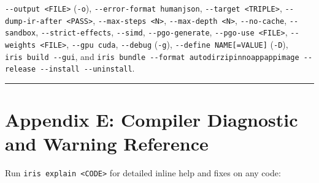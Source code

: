 \documentclass[
  english,
  oneside]{book}
\begin{document}
\texttt{-\/-output\ \textless{}FILE\textgreater{}} (\texttt{-o}),
\texttt{-\/-error-format\ human\textbar{}json},
\texttt{-\/-target\ \textless{}TRIPLE\textgreater{}},
\texttt{-\/-dump-ir-after\ \textless{}PASS\textgreater{}},
\texttt{-\/-max-steps\ \textless{}N\textgreater{}},
\texttt{-\/-max-depth\ \textless{}N\textgreater{}},
\texttt{-\/-no-cache}, \texttt{-\/-sandbox},
\texttt{-\/-strict-effects}, \texttt{-\/-simd},
\texttt{-\/-pgo-generate},
\texttt{-\/-pgo-use\ \textless{}FILE\textgreater{}},
\texttt{-\/-weights\ \textless{}FILE\textgreater{}},
\texttt{-\/-gpu\ cuda}, \texttt{-\/-debug} (\texttt{-g}),
\texttt{-\/-define\ NAME{[}=VALUE{]}} (\texttt{-D}),
\texttt{iris\ build\ -\/-gui}, and
\texttt{iris\ bundle\ -\/-format\ auto\textbar{}dir\textbar{}zip\textbar{}inno\textbar{}app\textbar{}appimage\ -\/-release\ -\/-install\ -\/-uninstall}.

\begin{center}\rule{0.5\linewidth}{0.5pt}\end{center}

\chapter{Appendix E: Compiler Diagnostic and Warning
Reference}\label{appendix-e-compiler-diagnostic-and-warning-reference}

Run \texttt{iris\ explain\ \textless{}CODE\textgreater{}} for detailed
inline help and fixes on any code:
\end{document}
